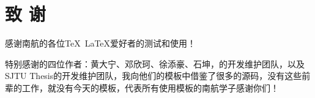 \chapter{致 \quad 谢}

感谢南航的各位\TeX~\LaTeX 爱好者的测试和使用！

特别感谢\oldnuaathesis 的四位作者：黄大宁、邓欣珂、徐添豪、石坤，\seuthesix 的开发维护团队，以及SJTU Thesis的开发维护团队，我向他们的模板中借鉴了很多的源码，没有这些前辈的工作，就没有今天的\nuaathesis 模板，代表所有使用\nuaathesis 模板的南航学子感谢你们！

